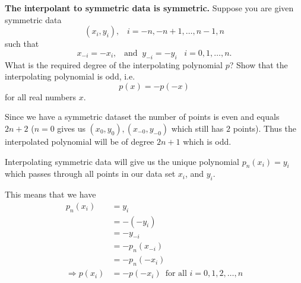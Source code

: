\textbf{The interpolant to symmetric data is symmetric.} Suppose you
are given symmetric data \[(x_i, y_i), \;\;\; i= -n, -n+1, \dots, n-1,
n\] such that \[x_{-i} = -x_i, \;\;\; \text{and} \;\; y_{-i} = -y_i
\;\;\; i=0,1,\dots,n.\]
What is the required degree of the interpolating polynomial $p$? Show
that the interpolating polynomial is odd, i.e. \[p(x) = -p(-x)\] for
all real numbers $x$.

{\color{blue}

Since we have a symmetric dataset the number of points is even and
equals $2n + 2$ ($n=0$ gives us $(x_0, y_0), (x_{-0}, y_{-0})$ which still has $2$ points). Thus the interpolated polynomial will be of degree
$2n + 1$ which is odd.

Interpolating symmetric data will give us the unique polynomial $p_n(x_i) =
y_i$ which passes through all points in our data set $x_i$, and $y_i$.

This means that we have
\begin{align*}
p_n(x_i) &= y_i \\
          &= -(-y_i) \\
          &= -y_{-i} \\
          &= - p_n(x_{-i}) \\
          &= - p_n(-x_i) \\
\Rightarrow p(x_i) &= -p(-x_i) \,\,\, \text{for all } i = 0,1,2,\dots,n
\end{align*}

}
